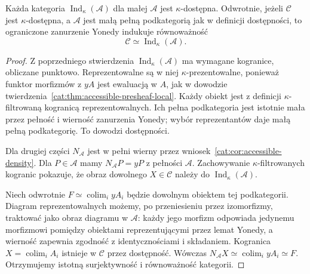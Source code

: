 \begin{twierdzenie}\label{cat:thm:accessible-ind-representation}
Każda kategoria $\operatorname{Ind}_\kappa(\mathcal A)$ dla małej $\mathcal A$ jest $\kappa$-dostępna. Odwrotnie, jeżeli $\mathcal C$ jest $\kappa$-dostępna, a $\mathcal A$ jest małą pełną podkategorią jak w definicji dostępności, to ograniczone zanurzenie Yonedy indukuje równoważność
\[
 \mathcal C\simeq\operatorname{Ind}_\kappa(\mathcal A).
\]
\end{twierdzenie}
\begin{proof}
Z poprzedniego stwierdzenia $\operatorname{Ind}_\kappa(\mathcal A)$ ma wymagane kogranice, obliczane punktowo. Reprezentowalne są w niej $\kappa$-prezentowalne, ponieważ funktor morfizmów z $yA$ jest ewaluacją w $A$, jak w dowodzie twierdzenia~\ref{cat:thm:accessible-presheaf-local}. Każdy obiekt jest z definicji $\kappa$-filtrowaną kogranicą reprezentowalnych. Ich pełna podkategoria jest istotnie mała przez pełność i wierność zanurzenia Yonedy; wybór reprezentantów daje małą pełną podkategorię. To dowodzi dostępności.

Dla drugiej części $N_{\mathcal A}$ jest w pełni wierny przez wniosek~\ref{cat:cor:accessible-density}. Dla $P\in\mathcal A$ mamy $N_{\mathcal A}P=yP$ z pełności $\mathcal A$. Zachowywanie $\kappa$-filtrowanych kogranic pokazuje, że obraz dowolnego $X\in\mathcal C$ należy do $\operatorname{Ind}_\kappa(\mathcal A)$.

Niech odwrotnie $F\simeq\operatorname{colim}_i yA_i$ będzie dowolnym obiektem tej podkategorii. Diagram reprezentowalnych możemy, po przeniesieniu przez izomorfizmy, traktować jako obraz diagramu w $\mathcal A$: każdy jego morfizm odpowiada jedynemu morfizmowi pomiędzy obiektami reprezentującymi przez lemat Yonedy, a wierność zapewnia zgodność z identycznościami i składaniem. Kogranica $X=\operatorname{colim}_i A_i$ istnieje w $\mathcal C$ przez dostępność. Wówczas $N_{\mathcal A}X\simeq\operatorname{colim}_i yA_i\simeq F$. Otrzymujemy istotną surjektywność i równoważność kategorii.
\end{proof}

